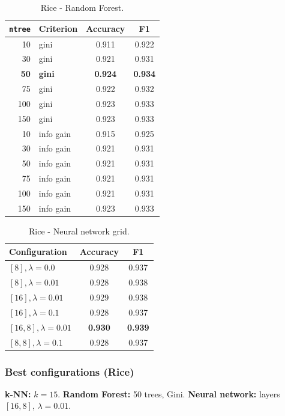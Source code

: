 \documentclass[11pt]{article}
\begin{document}
\begin{table}[htbp]
  \centering
  \footnotesize
  \caption{Rice - Random Forest.}
  \label{tab:rice-rf}
  \begin{tabular}{r l cc}
    \toprule
    \texttt{ntree} & Criterion & Accuracy & F1 \\
    \midrule
    10 & gini & 0.911 & 0.922 \\
    30 & gini & 0.921 & 0.931 \\
    \textbf{50} & \textbf{gini} & \textbf{0.924} & \textbf{0.934} \\
    75 & gini & 0.922 & 0.932 \\
    100 & gini & 0.923 & 0.933 \\
    150 & gini & 0.923 & 0.933 \\
    \midrule
    10 & info gain & 0.915 & 0.925 \\
    30 & info gain & 0.921 & 0.931 \\
    50 & info gain & 0.921 & 0.931 \\
    75 & info gain & 0.921 & 0.931 \\
    100 & info gain & 0.921 & 0.931 \\
    150 & info gain & 0.923 & 0.933 \\
    \bottomrule
  \end{tabular}
\end{table}

\begin{table}[htbp]
  \centering
  \footnotesize
  \caption{Rice - Neural network grid.}
  \label{tab:rice-nn}
  \begin{tabular}{l cc}
    \toprule
    Configuration & Accuracy & F1 \\
    \midrule
    $[8], \lambda{=}0.0$ & 0.928 & 0.937 \\
    $[8], \lambda{=}0.01$ & 0.928 & 0.938 \\
    $[16], \lambda{=}0.01$ & 0.929 & 0.938 \\
    $[16], \lambda{=}0.1$ & 0.928 & 0.937 \\
    \textbf{$[16,8], \lambda{=}0.01$} & \textbf{0.930} & \textbf{0.939} \\
    $[8,8], \lambda{=}0.1$ & 0.928 & 0.937 \\
    \bottomrule
  \end{tabular}
\end{table}

\subsubsection{Best configurations (Rice)}
\textbf{k-NN:} $k=15$. \newline
\textbf{Random Forest:} 50 trees, Gini. \newline
\textbf{Neural network:} layers $[16,8]$, $\lambda=0.01$.
\end{document}
